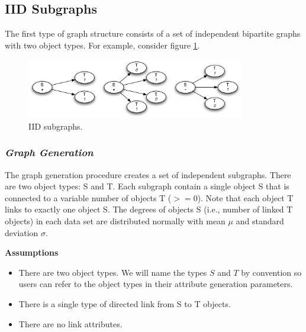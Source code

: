 \documentclass[11pt]{article}
\begin{document}
\vspace{-2.mm}
\subsection*{IID Subgraphs}
\vspace{-4.mm}
The first type of graph structure consists of a set of independent bipartite graphs with two object types. For example, consider figure \ref{iid}.

\begin{figure}[ht] 
	\begin{center}
	\includegraphics[width=3.75in]{./graphics/synthetic-data}
	\end{center} \vspace{-6.mm}
	\caption{ \label{iid} IID subgraphs.} 
\end{figure} 

\vspace{-3.mm}
\subsubsection*{\emph{Graph Generation}}
\vspace{-5.mm}
The graph generation procedure creates a set of independent subgraphs. There are two object types: S and T. Each subgraph contain a single object S that is connected to a variable number of objects T ($>=0$). Note that each object T links to exactly one object S. The degrees of objects S (i.e., number of linked T objects) in each data set are distributed normally with mean $\mu$ and standard deviation $\sigma$.

\small{
\textbf{Assumptions}
\vspace{-5.mm}
\begin{itemize}
\item There are two object types. We will name the types $S$ and $T$ by convention so users can refer to the object types in their attribute generation parameters.
\item There is a single type of directed link from S to T objects.
\item There are no link attributes.
\end{itemize}
}
\end{document}
